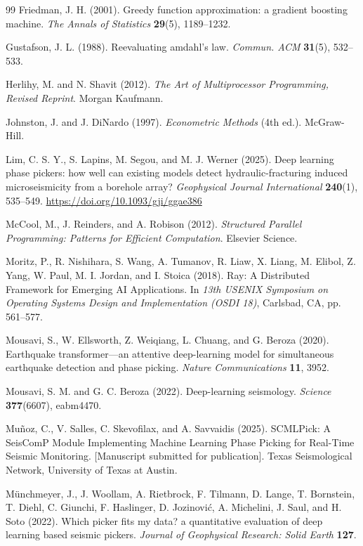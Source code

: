 \begin{thebibliography}{99}
Friedman, J. H. (2001). Greedy function approximation: a gradient boosting machine. \textit{The Annals of Statistics} \textbf{29}(5), 1189--1232.

Gustafson, J. L. (1988). Reevaluating amdahl's law. \textit{Commun. ACM} \textbf{31}(5), 532--533.

Herlihy, M. and N. Shavit (2012). \textit{The Art of Multiprocessor Programming, Revised Reprint}. Morgan Kaufmann.

Johnston, J. and J. DiNardo (1997). \textit{Econometric Methods} (4th ed.). McGraw-Hill.

Lim, C. S. Y., S. Lapins, M. Segou, and M. J. Werner (2025). Deep learning phase pickers: how well can existing models detect hydraulic-fracturing induced microseismicity from a borehole array? \textit{Geophysical Journal International} \textbf{240}(1), 535--549. \url{https://doi.org/10.1093/gji/ggae386}

McCool, M., J. Reinders, and A. Robison (2012). \textit{Structured Parallel Programming: Patterns for Efficient Computation}. Elsevier Science.

Moritz, P., R. Nishihara, S. Wang, A. Tumanov, R. Liaw, X. Liang, M. Elibol, Z. Yang, W. Paul, M. I. Jordan, and I. Stoica (2018). Ray: A Distributed Framework for Emerging AI Applications. In \textit{13th USENIX Symposium on Operating Systems Design and Implementation (OSDI 18)}, Carlsbad, CA, pp. 561--577.

Mousavi, S., W. Ellsworth, Z. Weiqiang, L. Chuang, and G. Beroza (2020). Earthquake transformer---an attentive deep-learning model for simultaneous earthquake detection and phase picking. \textit{Nature Communications} \textbf{11}, 3952.

Mousavi, S. M. and G. C. Beroza (2022). Deep-learning seismology. \textit{Science} \textbf{377}(6607), eabm4470.

Muñoz, C., V. Salles, C. Skevofilax, and A. Savvaidis (2025). SCMLPick: A SeisComP Module Implementing Machine Learning Phase Picking for Real-Time Seismic Monitoring. [Manuscript submitted for publication]. Texas Seismological Network, University of Texas at Austin.

Münchmeyer, J., J. Woollam, A. Rietbrock, F. Tilmann, D. Lange, T. Bornstein, T. Diehl, C. Giunchi, F. Haslinger, D. Jozinović, A. Michelini, J. Saul, and H. Soto (2022). Which picker fits my data? a quantitative evaluation of deep learning based seismic pickers. \textit{Journal of Geophysical Research: Solid Earth} \textbf{127}.


\end{thebibliography}
